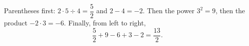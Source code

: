 Parentheses first: $2\cdot5\div4=\dfrac52$ and $2-4=-2$. Then the power $3^2=9$, then the product $-2\cdot3=-6$. Finally, from left to right,
\[\dfrac52+9-6+3-2=\boxed{\dfrac{13}{2}}.\]
